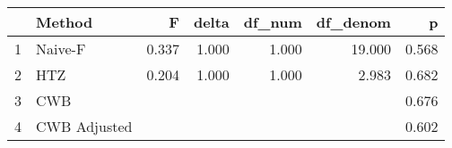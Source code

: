 \begin{table}[ht]
\centering
\begin{tabular}{rlrrrrr}
  \hline
 & Method & F & delta & df\_num & df\_denom & p \\ 
  \hline
1 & Naive-F & 0.337 & 1.000 & 1.000 & 19.000 & 0.568 \\ 
  2 & HTZ & 0.204 & 1.000 & 1.000 & 2.983 & 0.682 \\ 
  3 & CWB &  &  &  &  & 0.676 \\ 
  4 & CWB Adjusted &  &  &  &  & 0.602 \\ 
   \hline
\end{tabular}
\end{table}
